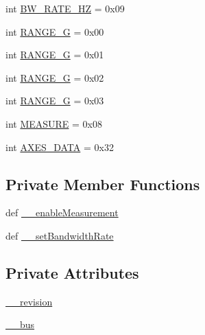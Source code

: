 \begin{DoxyCompactItemize}
\item 
int \hyperlink{classlibsensorPy_1_1concretesensor_1_1adxl345_1_1ADXL345_ac705f269d41822e227d313d194d8b461}{B\+W\+\_\+\+R\+A\+T\+E\+\_\+H\+Z} = 0x09
\item 
int \hyperlink{classlibsensorPy_1_1concretesensor_1_1adxl345_1_1ADXL345_a13f1e07510da5e436de0206525b67445}{R\+A\+N\+G\+E\+\_\+G} = 0x00
\item 
int \hyperlink{classlibsensorPy_1_1concretesensor_1_1adxl345_1_1ADXL345_aecb45b859b07e51b37678790a1fcedbc}{R\+A\+N\+G\+E\+\_\+G} = 0x01
\item 
int \hyperlink{classlibsensorPy_1_1concretesensor_1_1adxl345_1_1ADXL345_a062b30aed4d476b601ec1c1d094e9846}{R\+A\+N\+G\+E\+\_\+G} = 0x02
\item 
int \hyperlink{classlibsensorPy_1_1concretesensor_1_1adxl345_1_1ADXL345_a9310cf152a1cdfdcda9414538de2978c}{R\+A\+N\+G\+E\+\_\+G} = 0x03
\item 
int \hyperlink{classlibsensorPy_1_1concretesensor_1_1adxl345_1_1ADXL345_a671129cc1aee99610c4d0672d3d9c154}{M\+E\+A\+S\+U\+R\+E} = 0x08
\item 
int \hyperlink{classlibsensorPy_1_1concretesensor_1_1adxl345_1_1ADXL345_a2ec38fe44ec0aeec7f8ff6c932364aca}{A\+X\+E\+S\+\_\+\+D\+A\+T\+A} = 0x32
\end{DoxyCompactItemize}
\subsection*{Private Member Functions}
\begin{DoxyCompactItemize}
\item 
def \hyperlink{classlibsensorPy_1_1concretesensor_1_1adxl345_1_1ADXL345_a6f42721e29a2f918c1b34e95c854ff06}{\+\_\+\+\_\+enable\+Measurement}
\item 
def \hyperlink{classlibsensorPy_1_1concretesensor_1_1adxl345_1_1ADXL345_abf0c5b4cd8d57475d016f482af5a39e4}{\+\_\+\+\_\+set\+Bandwidth\+Rate}
\end{DoxyCompactItemize}
\subsection*{Private Attributes}
\begin{DoxyCompactItemize}
\item 
\hyperlink{classlibsensorPy_1_1concretesensor_1_1adxl345_1_1ADXL345_aa1ae5388f1c6394f3fdaebf4f4337452}{\+\_\+\+\_\+revision}
\item 
\hyperlink{classlibsensorPy_1_1concretesensor_1_1adxl345_1_1ADXL345_a692231f22c4475f0c80c464c93bf21c3}{\+\_\+\+\_\+bus}
\end{DoxyCompactItemize}


